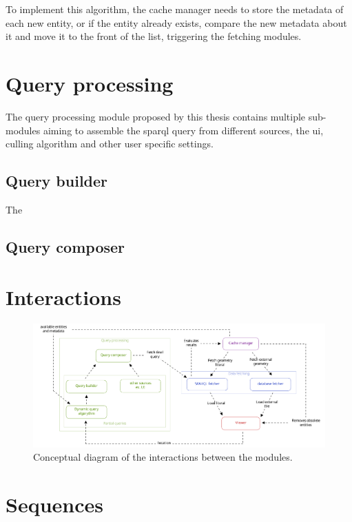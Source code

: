 To implement this algorithm, the cache manager needs to store the metadata of each new entity, or if the entity already exists, compare the new metadata about it and move it to the front of the list, triggering the fetching modules.

\section{Query processing}

The query processing module proposed by this thesis contains multiple sub-modules aiming to assemble the \ac{sparql} query from different sources, the ui, culling algorithm and other user specific settings.

\subsection{Query builder}

The 

\subsection{Query composer}

\section{Interactions} \label{sec:interactions}

\begin{figure}[H]
  \centering
  \includegraphics[width=\textwidth]{figures/pdf/interactions_concept.pdf}
  \caption[Interactions modular framework]{Conceptual diagram of the interactions between the modules.}
  \label{fig:interactionModules}
\end{figure}

\section{Sequences}
